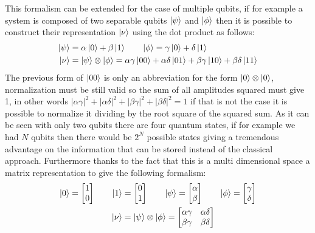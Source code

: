 This formalism can be extended  for the case of multiple qubits, if for example a system is composed of two separable qubits $\ket{\psi}$ and $\ket{\phi}$ then it is possible to construct their representation $\ket{\nu}$ using the dot product as follows:
\begin{align*}
	\ket{\psi} &= \alpha \ket{0} + \beta \ket{1} \qquad
	\ket{\phi} = \gamma \ket{0} + \delta \ket{1}\\
	\ket{\nu} &= \ket{\psi} \otimes \ket{\phi} = \alpha\gamma \ket{00} + \alpha\delta \ket{01} + \beta\gamma \ket{10} + \beta\delta\ket{11}\\
\end{align*}
The previous form of $\ket{00}$ is only an abbreviation for the form $\ket{0} \otimes \ket{0}$,
normalization must be still valid so the sum of all amplitudes squared must give 1, in other words $|\alpha\gamma|^2  + |\alpha\delta|^2  + |\beta\gamma|^2  + |\beta\delta|^2 = 1$ if that is not the case it is possible to normalize it dividing by the root square of the squared sum. As it can be seen with only two qubits there are four quantum states, if for example we had $N$ qubits then there would be $2^N$ possible states giving a tremendous advantage on the information that can be stored instead of the classical approach.
Furthermore thanks to the fact that this is a multi dimensional space a matrix representation to give the following formalism:
\begin{align*}
	\ket{0} =   
		\begin{bmatrix}
			1 \\
			0
		\end{bmatrix}
	\qquad
	\ket{1} &=
	   \begin{bmatrix}
	   	0 \\
	   	1
	   \end{bmatrix}
    \qquad
    \ket{\psi} =
   		\begin{bmatrix}
   		 \alpha \\
   		 \beta
   		\end{bmatrix}
   	\qquad
   	\ket{\phi} =
   		\begin{bmatrix}
   		\gamma \\
   		\delta
   		\end{bmatrix}\\
   		\ket{\nu} &= \ket{\psi} \otimes \ket{\phi} = 
   		\begin{bmatrix}
   			\alpha\gamma & \alpha\delta\\
   			\beta\gamma  & \beta\delta
   		\end{bmatrix}\\
\end{align*}
